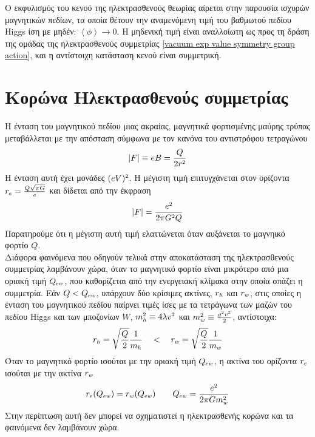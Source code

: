 Ο εκφυλισμός του κενού της ηλεκτρασθενούς θεωρίας αίρεται στην παρουσία ισχυρών μαγνητικών πεδίων, τα οποία θέτουν την αναμενόμενη τιμή του βαθμωτού πεδίου Higgs ίση με μηδέν: $\left<\phi\right>\rightarrow0$. Η μηδενική τιμή είναι  αναλλοίωτη ως προς τη δράση της ομάδας της ηλεκτρασθενούς συμμετρίας \eqref{vacuum exp value symmetry group action}, και η αντίστοιχη κατάσταση κενού είναι συμμετρική. 

\section{Κορώνα Ηλεκτρασθενούς συμμετρίας}
Η ένταση του μαγνητικού πεδίου μιας ακραίας, μαγνητικά φορτισμένης μαύρης τρύπας μεταβάλλεται με την απόσταση σύμφωνα με τον κανόνα του αντιστρόφου τετραγώνου
\begin{equation}
    |F|\equiv eB = \frac{Q}{2r\superscr{2}}
\end{equation}
Η ένταση αυτή έχει μονάδες $(eV)\superscr{2}$. Η μέγιστη τιμή επιτυγχάνεται στον ορίζοντα $r\subscr{e}=\frac{Q\sqrt{\pi G}}{e}$ και δίδεται από την έκφραση
\begin{equation}
    |F|=\frac{e\superscr{2}}{2\pi G\superscr{2}Q}
\end{equation}
Παρατηρούμε ότι η μέγιστη αυτή τιμή ελαττώνεται όταν αυξάνεται το μαγνηικό φορτίο $Q$.\\

Διάφορα φαινόμενα που οδηγούν τελικά στην αποκατάσταση της ηλεκτρασθενούς συμμετρίας λαμβάνουν χώρα, όταν το μαγνητικό φορτίο είναι μικρότερο από μια οριακή τιμή $Q\subscr{ew}$, που καθορίζεται από την ενεργειακή κλίμακα στην οποία σπάζει η συμμετρία. 
Εάν $Q<Q\subscr{ew}$, υπάρχουν δύο κρίσιμες ακτίνες, $r\subscr{h}$ και $r\subscr{w}$, στις οποίες η ένταση του μαγνητικού πεδίου παίρνει τιμές ίσες με τα τετράγωνα των μαζών του πεδίου Higgs και των μποζονίων $W$, $m\subscr{h}\superscr{2}\equiv 4\lambda v\superscr{2}$ και $m\subscr{w}\superscr{2}\equiv \frac{g\superscr{2}v\superscr{2}}{2}$, αντίστοιχα:
\begin{equation}
    r\subscr{h}=\sqrt{\frac{Q}{2}}\frac{1}{m\subscr{h}}\quad < \quad r\subscr{w}=\sqrt{\frac{Q}{2}}\frac{1}{m\subscr{w}}
\end{equation}
Όταν το μαγνητικό φορτίο ισούται με την οριακή τιμή $Q\subscr{ew}$, η ακτίνα του ορίζοντα $r\subscr{e}$ ισούται με την ακτίνα $r\subscr{w}$
\begin{equation}
    r\subscr{e}(Q\subscr{ew})=r\subscr{w}(Q\subscr{ew})\qquad Q\subscr{ew}=\frac{e\superscr{2}}{2\pi G m\superscr{2}\subscr{w}}
\end{equation}
Στην περίπτωση αυτή δεν μπορεί να σχηματιστεί η ηλεκτρασθενής κορώνα και τα φαινόμενα δεν λαμβάνουν χώρα.\\ 

